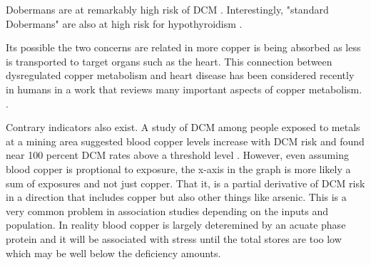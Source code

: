 {Dobermans are at remarkably high risk of DCM 
\cite{Ezer_Saarinen_Katayama_Identification_novel_genetic_2023}.
Interestingly, "standard Dobermans" are also at high risk for hypothyroidism
\cite{PMC9552398}.

Its possible the two concerns are related in more copper
is being absorbed as less is  transported to target organs
such as the heart.
This connection between dysregulated copper metabolism and 
heart disease has been considered recently in humans
\cite{PMC8838622} in a work that reviews many important
aspects of copper metabolism. .

Contrary indicators also exist. A study of DCM among people 
exposed to metals at a mining area suggested blood copper levels
increase with DCM risk and found near 100 percent DCM rates
above a threshold level \cite{MalambaLez_TshalaKatumbay_Bito_Concurrent_Heavy_Metal_Exposures_2021}.
However, even assuming blood copper is proptional to exposure,
the x-axis in the graph is more likely a sum of exposures
and not just copper.  That it, is a partial derivative of DCM
risk in a direction that includes copper but also other things
like arsenic. This is a very common problem in association
studies depending on the inputs and population.
In reality blood copper is largely deteremined by an acuate phase
protein and it will be associated with stress until
the total stores are too low which may be well below the
deficiency amounts. 


} %
